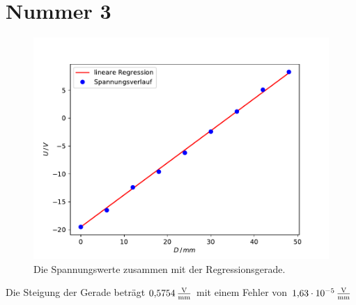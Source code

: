 \section{Nummer 3}
\label{sec:nummer3}

\begin{figure}
    \centering
    \caption{Die Spannungswerte zusammen mit der Regressionsgerade.}
    \includegraphics[scale=0.5]{content/data/regression.pdf}
\end{figure}
Die Steigung der Gerade beträgt $\SI{0.5754}{\frac{\volt}{\milli\meter}}$ mit einem Fehler von $\SI{1.63e-5}{\frac{\volt}{\milli\meter}}$